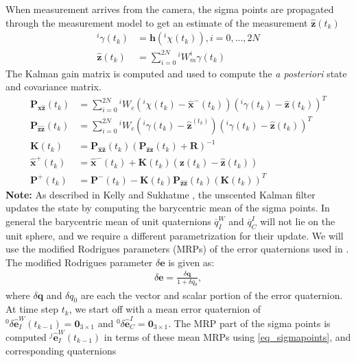 \documentclass[letterpaper]{article}
\newcommand{\bb}[1]{\mathbf{#1}}
\begin{document}
When measurement arrives from the camera, the sigma points are
propagated through the measurement model to get an estimate of the
measurement $\bb{\hat{z}}(t_k)$
\begin{align}
^i \gamma(t_k) &= \bb{h}(^i \chi(t_k)), i=0,...,2N \\
\bb{\hat{z}}(t_k) &=\sum_{i=0}^{2N} \text{} ^iW_m ^i\gamma(t_k) \nonumber
\end{align}
The Kalman gain matrix is computed and used to compute the \emph{a
  posteriori} state and covariance matrix.
\begin{align}
\bb{P}_{\bb{\hat{x}\hat{z}}}(t_k)&=\sum_{i=0}^{2N} \text{} ^iW_c\left( ^i \chi(t_k) - \bb{\hat{x}}^-(t_k) \right) \left( ^i \gamma(t_k)- \bb{\hat{z}}(t_k) \right)^T \\
\bb{P}_{\bb{\hat{z}\hat{z}}}(t_k)&=\sum_{i=0}^{2N} \text{} ^iW_c\left( ^i \gamma(t_k) - \bb{\hat{z}}^(t_k) \right) \left( ^i \gamma(t_k)- \bb{\hat{z}}(t_k) \right)^T \nonumber \\
\bb{K}(t_k)&=\bb{P}_{\bb{\hat{x}\hat{z}}}(t_k) \left( \bb{P}_{\bb{\hat{z}\hat{z}}}(t_k) + \bb{R} \right)^{-1} \nonumber \\
\bb{\hat{x}}^+(t_k)&=\bb{\hat{x}}^-(t_k)+\bb{K}(t_k)\left( \bb{z}(t_k)-\bb{\hat{z}}(t_k) \right) \nonumber \\
\bb{P}^+(t_k)&=\bb{P}^-(t_k)-\bb{K}(t_k)\bb{P}_{\bb{\hat{z}\hat{z}}}(t_k)(\bb{K}(t_k))^T \nonumber
\end{align}
\textbf{Note:} As described in Kelly and Sukhatme \cite{2011:kelly:article}, the unscented
Kalman filter updates the state by computing the barycentric mean of
the sigma points. In general the barycentric mean of unit quaternions
$\overline{q}_I^W$ and $\overline{q}_C^I$ will not lie on the unit
sphere, and we require a different parametrization for their
update. We will use the modified Rodrigues parameters (MRPs) of the
error quaternions used in \cite{2011:kelly:article}. The modified Rodrigues
parameter $\delta \bb{e}$ is given as:
\begin{align}
\delta \bb{e}=\frac{\delta \bb{q}}{1+\delta q_0},
\end{align}
where $\delta \bb{q}$ and $\delta q_0$ are each the vector and scalar
portion of the error quaternion. At time step $t_k$, we start off with
a mean error quaternion of $^0\delta
\bb{\hat{e}}_I^W(t_{k-1})=\bb{0}_{3 \times 1}$ and $^0\delta
\bb{\hat{e}}_C^I=\bb{0}_{3 \times 1}$. The MRP part of the sigma
points is computed $^j \bb{\hat{e}}_I^W(t_{k-1})$ in terms of these
mean MRPs using \ref{eq_sigmapoints}, and corresponding quaternions
\end{document}
